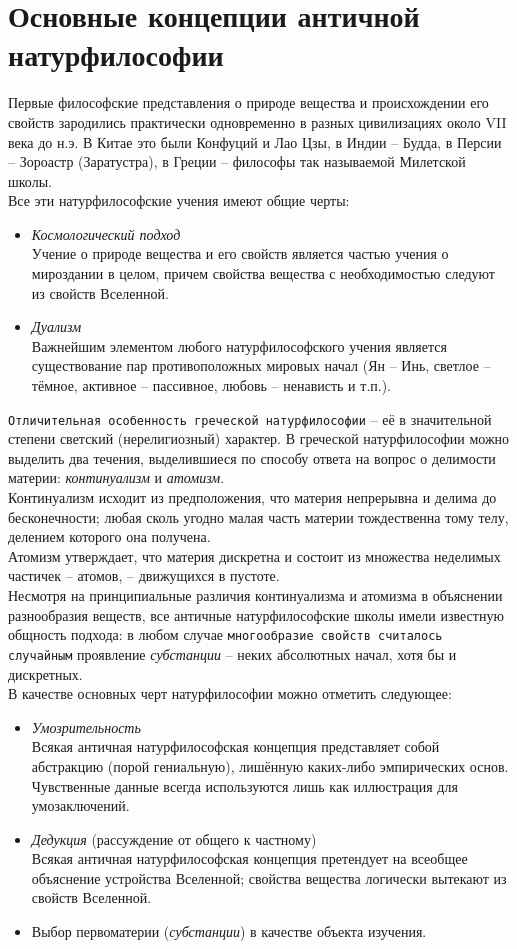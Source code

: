 \documentclass[12pt]{article}
\begin{document}
\section{Основные концепции античной натурфилософии}
Первые философские представления о природе вещества и происхождении его свойств зародились практически
одновременно в разных цивилизациях около VII века до н.э. В Китае это были Конфуций и Лао Цзы, в Индии –
Будда, в Персии – Зороастр (Заратустра), в Греции – философы так называемой Милетской школы. \\
Все эти натурфилософские учения имеют общие черты:
\begin{itemize}
\item \textit{Космологический подход}\\
	Учение о природе вещества и его свойств является частью учения о мироздании в
	целом, причем свойства вещества с необходимостью следуют из свойств Вселенной.
\item \textit{Дуализм}\\
	Важнейшим элементом любого натурфилософского учения является существование пар
	противоположных мировых начал
	(Ян – Инь, светлое – тёмное, активное – пассивное, любовь – ненависть и т.п.).
\end{itemize}
\texttt{Отличительная особенность греческой натурфилософии} – её в значительной степени светский (нерелигиозный)
характер. В греческой натурфилософии можно выделить два течения, выделившиеся по способу ответа на
вопрос о делимости материи: \textit{континуализм} и \textit{атомизм}. \\
Континуализм исходит из предположения, что материя непрерывна и делима до бесконечности; любая сколь
угодно малая часть материи тождественна тому телу, делением которого она получена. \\
Атомизм утверждает, что материя дискретна и состоит из множества неделимых частичек – атомов, –
движущихся в пустоте. \\
Несмотря на принципиальные различия континуализма и атомизма в объяснении разнообразия веществ, все
античные натурфилософские школы имели известную общность подхода: в любом случае \texttt{многообразие
свойств считалось случайным} проявление \textit{субстанции} – неких абсолютных начал, хотя бы и дискретных.\\
В качестве основных черт натурфилософии можно отметить следующее:
\begin{itemize}
\item \textit{Умозрительность}\\
	Всякая античная натурфилософская концепция представляет собой абстракцию (порой
	гениальную), лишённую каких-либо эмпирических основ.
	Чувственные данные всегда используются лишь как иллюстрация для умозаключений.
\item \textit{Дедукция} (рассуждение от общего к частному) \\
	Всякая античная натурфилософская концепция претендует на
	всеобщее объяснение устройства Вселенной; свойства вещества логически вытекают из свойств Вселенной.
\item Выбор первоматерии (\textit{субстанции}) в качестве объекта изучения.
\end{itemize}
\end{document}
